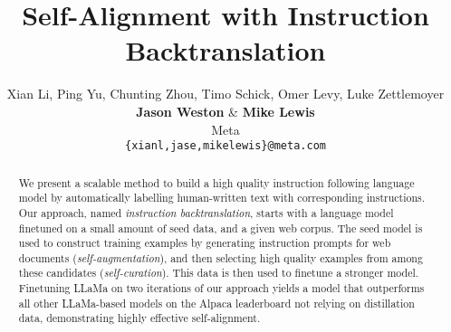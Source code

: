 \documentclass{article} %
\title{Self-Alignment with Instruction Backtranslation}
\author{Xian Li, Ping Yu, Chunting Zhou, Timo Schick, Omer Levy, Luke Zettlemoyer\\
\textbf{Jason Weston} \& \textbf{Mike Lewis}  \\
Meta\\
\texttt{\{xianl,jase,mikelewis\}@meta.com} \\
}
\begin{document}
\maketitle

\begin{abstract}
We present a scalable method to build a high quality instruction following language model by automatically labelling human-written text with corresponding instructions. Our approach, named {\em instruction backtranslation}, starts with a language model finetuned on a small amount of seed data, and a given web corpus. The seed model is used to construct training examples by generating instruction prompts for web documents ({\em self-augmentation}), and then  selecting high quality examples from among these candidates ({\em self-curation}).  This data is then used to finetune a stronger model.  Finetuning LLaMa on two iterations of our approach yields a model that outperforms all other LLaMa-based models on the Alpaca leaderboard not relying on distillation data, demonstrating highly effective self-alignment.

\end{abstract}








\newpage




\newpage


\end{document}
